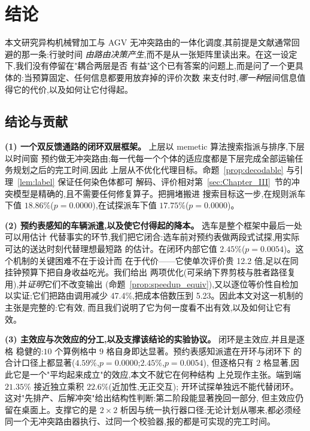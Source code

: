 \documentclass[manuscript,screen,review]{acmart}
\newcommand{\NCases}{10}
\newcommand{\GainLoopRule}{18.86\%}      %
\newcommand{\PLoopRule}{0.0000}
\newcommand{\GainLoopProbe}{17.75\%}     %
\newcommand{\PLoopProbe}{0.0000}
\newcommand{\GainProbeOpen}{4.59\%}      %
\newcommand{\PProbeOpen}{0.0000}
\newcommand{\GainProbeLoop}{2.45\%}      %
\newcommand{\PProbeLoop}{0.0054}
\newcommand{\GainEndToEnd}{21.35\%}      %
\newcommand{\GainIndepProduct}{22.6\%}
\newcommand{\CellsSigLoop}{9}
\newcommand{\CellsSigProbe}{2}
\newcommand{\RouteCallCut}{47.4\%}
\newcommand{\CostMultBefore}{12.2}
\newcommand{\CostMultAfter}{5.23}
\begin{document}

\section{结论}
\label{sec:Chapter_VI}

本文研究异构机械臂加工与 AGV 无冲突路由的一体化调度,其前提是文献通常回避的那一条:行驶时间
\emph{由路由决策产生},而不是从一张矩阵里读出来。在这一设定下,我们没有停留在"耦合两层是否
有益"这个已有答案的问题上,而是问了一个更具体的:当预算固定、任何信息都要用放弃掉的评价次数
来支付时,\emph{哪一种}层间信息值得它的代价,以及如何让它付得起。

\subsection{结论与贡献}
\label{sec:contributions}

\textbf{(1) 一个双反馈通路的闭环双层框架。} 上层以 memetic 算法搜索指派与排序,下层以时间窗
预约做无冲突路由;每一代每一个个体的适应度都是下层完成全部运输任务规划之后的完工时间,因此
上层从不优化代理目标。命题~\ref{prop:decodable} 与引理~\ref{lem:label} 保证任何染色体都可
解码、评价相对第~\ref{sec:Chapter_III}~节的冲突模型是精确的,且不需要任何修复算子。把拥堵搬进
搜索目标这一步,在规则派车下值 $\GainLoopRule$($p=\PLoopRule$),在试探派车下值
$\GainLoopProbe$($p=\PLoopProbe$)。

\textbf{(2) 预约表感知的车辆派遣,以及使它付得起的降本。} 选车是整个框架中最后一处可以用估计
代替事实的环节,我们把它闭合:选车前对预约表做两段式试探,用实际可达的送达时刻代替理想最短路
的估计。在闭环内部它值 $\GainProbeLoop$($p=\PProbeLoop$)。这个机制的关键困难不在于设计而
在于代价——它使单次评价贵 \CostMultBefore{} 倍,足以在同挂钟预算下把自身收益吃光。我们给出
两项优化(可采纳下界剪枝与胜者路径复用),并\emph{证明}它们不改变输出
(命题~\ref{prop:speedup_equiv}),又以逐位等价性自检加以实证;它们把路由调用减少
\RouteCallCut{},把成本倍数压到 \CostMultAfter{}。因此本文对这一机制的主张是完整的:它有效,
而且我们说明了它为何一度看不出有效,以及如何让它有效。

\textbf{(3) 主效应与次效应的分工,以及支撑该结论的实验协议。} 闭环是主效应,并且是逐格
稳健的:$\NCases$ 个算例格中 $\CellsSigLoop$ 格自身即达显著。预约表感知派遣在开环与闭环下
的合计口径上都显著($\GainProbeOpen$,$p=\PProbeOpen$;$\GainProbeLoop$,$p=\PProbeLoop$),
但逐格只有 $\CellsSigProbe$ 格显著,因此它是一个"平均起来成立"的效应,本文不就它在何种结构
上兑现作主张。端到端 $\GainEndToEnd$ 接近独立乘积 $\GainIndepProduct$(近加性,无正交互);
开环试探单独远不能代替闭环。这对"先排产、后解冲突"给出结构性判断:第二阶段能显著挽回一部分,
但主效应仍留在桌面上。支撑它的是 $2\times2$ 析因与统一执行器口径:无论计划从哪来,都必须经
同一个无冲突路由器执行、过同一个校验器,报的都是可实现的完工时间。
\end{document}
